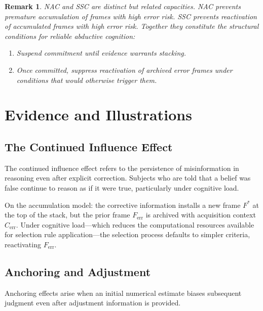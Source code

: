 \documentclass[12pt]{article}
\newtheorem{remark}{Remark}
\begin{document}
\begin{remark}
NAC and SSC are distinct but related capacities.
NAC prevents premature accumulation of frames with high error risk.
SSC prevents reactivation of accumulated frames with high error risk.
Together they constitute the structural conditions for reliable
abductive cognition:
\begin{enumerate}
  \item[\textbf{(NAC)}] Suspend commitment until evidence warrants
  stacking.
  \item[\textbf{(SSC)}] Once committed, suppress reactivation of
  archived error frames under conditions that would otherwise
  trigger them.
\end{enumerate}
\end{remark}

\section{Evidence and Illustrations}

\subsection{The Continued Influence Effect}

The continued influence effect \cite{ecker2022} refers to the
persistence of misinformation in reasoning even after explicit
correction.
Subjects who are told that a belief was false continue to reason
as if it were true, particularly under cognitive load.

On the accumulation model: the corrective information installs a
new frame $F^*$ at the top of the stack, but the prior frame
$F_\mathrm{err}$ is archived with acquisition context $C_\mathrm{err}$.
Under cognitive load---which reduces the computational resources
available for selection rule application---the selection process
defaults to simpler criteria, reactivating $F_\mathrm{err}$.

\subsection{Anchoring and Adjustment}

Anchoring effects \cite{epley2001} arise when an initial numerical
estimate biases subsequent judgment even after adjustment information
is provided.
\end{document}

